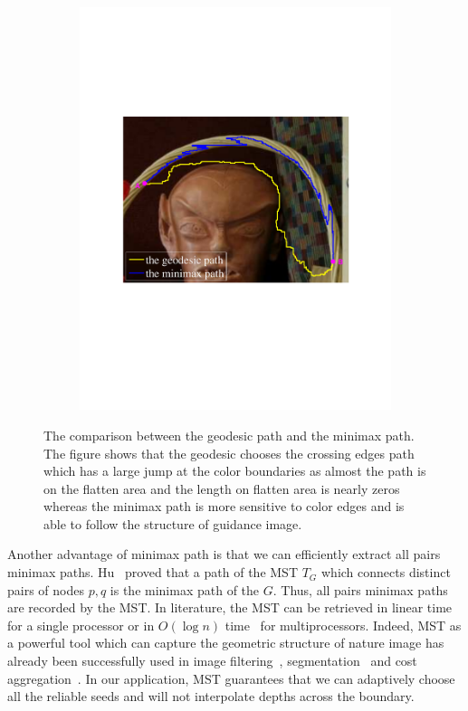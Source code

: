 \documentclass[preprint,10pt,5p,times,twocolumn]{elsarticle}
\begin{document}
\begin{figure}[t]
\centering
\begin{subfigure}[b]{0.75\linewidth}
    \centering
    \includegraphics[width=\linewidth]{path.pdf}
\end{subfigure}
\caption{ The comparison between the geodesic path and the minimax path. The figure shows that the geodesic chooses the crossing edges path which has a large jump at the color boundaries as almost the path is on the flatten area and the length on flatten area is nearly zeros whereas the minimax path is more sensitive to color edges and is able to follow the structure of guidance image.
}
\label{fig:minimax_path_comparison}
\end{figure}

Another advantage of minimax path is that we can efficiently extract all pairs minimax paths. Hu~\cite{Hu1961} proved that a path of the MST $T_G$ which connects distinct pairs of nodes $p,q$ is the minimax path of the $G$. Thus, all pairs minimax paths are recorded by the MST. In literature, the MST can be retrieved in linear time~\cite{Karger1995} for a single processor or in $O(\log n)$ time~\cite{Chong2001} for multiprocessors. Indeed, MST as a powerful tool which can capture the geometric structure of nature image has already been successfully used in image filtering~\cite{Stawiaski2009}, segmentation~\cite{Janakiraman2007} and cost aggregation~\cite{Yang2012}. In our application, MST guarantees that we can adaptively choose all the reliable seeds and will not interpolate depths across the boundary.
\end{document}
